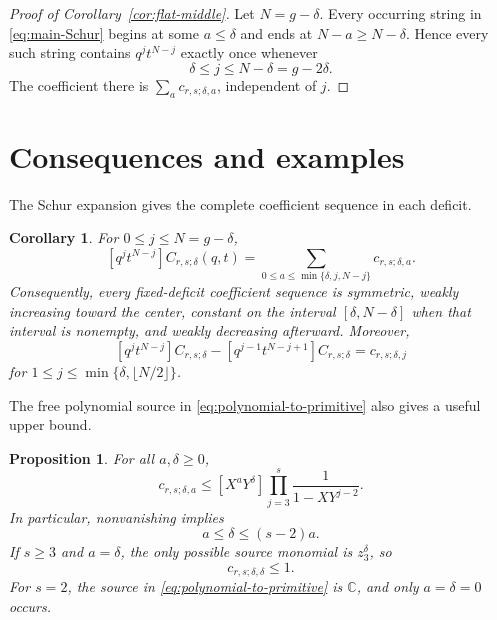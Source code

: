 \documentclass[11pt]{article}
\newtheorem{corollary}[theorem]{Corollary}
\newtheorem{proposition}[theorem]{Proposition}
\newcommand{\C}{\mathbb{C}}
\begin{document}
\begin{proof}[Proof of Corollary~\ref{cor:flat-middle}]
Let $N=g-\delta$.  Every occurring string in
\eqref{eq:main-Schur} begins at some $a\leq\delta$ and ends at
$N-a\geq N-\delta$.  Hence every such string contains
$q^jt^{N-j}$ exactly once whenever
\[
 \delta\leq j\leq N-\delta=g-2\delta.
\]
The coefficient there is $\sum_a c_{r,s;\delta,a}$, independent of
$j$.
\end{proof}

\section{Consequences and examples}\label{sec:consequences}

The Schur expansion gives the complete coefficient sequence in each
deficit.

\begin{corollary}\label{cor:coefficient-formula}
For $0\leq j\leq N=g-\delta$,
\begin{equation}\label{eq:coefficient-formula}
 [q^jt^{N-j}]C_{r,s;\delta}(q,t)
 =\sum_{0\leq a\leq\min\{\delta,j,N-j\}}
 c_{r,s;\delta,a}.
\end{equation}
Consequently, every fixed-deficit coefficient sequence is symmetric,
weakly increasing toward the center, constant on the interval
$[\delta,N-\delta]$ when that interval is nonempty, and weakly
decreasing afterward.  Moreover,
\begin{equation}\label{eq:coefficient-difference}
 [q^jt^{N-j}]C_{r,s;\delta}
 -[q^{j-1}t^{N-j+1}]C_{r,s;\delta}
 =c_{r,s;\delta,j}
\end{equation}
for $1\leq j\leq\min\{\delta,\lfloor N/2\rfloor\}$.
\end{corollary}

The free polynomial source in \eqref{eq:polynomial-to-primitive}
also gives a useful upper bound.

\begin{proposition}\label{prop:partition-bound}
For all $a,\delta\geq0$,
\begin{equation}\label{eq:partition-bound}
 c_{r,s;\delta,a}
 \leq
 [X^aY^\delta]
 \prod_{j=3}^s\frac1{1-XY^{j-2}}.
\end{equation}
In particular, nonvanishing implies
\begin{equation}\label{eq:two-sided-support}
 a\leq\delta\leq(s-2)a.
\end{equation}
If $s\geq3$ and $a=\delta$, the only possible source monomial is
$z_3^\delta$, so
\begin{equation}\label{eq:outer-multiplicity}
 c_{r,s;\delta,\delta}\leq1.
\end{equation}
For $s=2$, the source in \eqref{eq:polynomial-to-primitive} is
$\C$, and only $a=\delta=0$ occurs.
\end{proposition}
\end{document}
